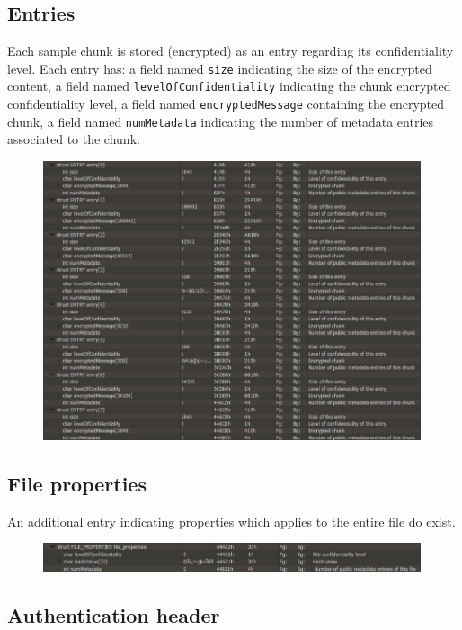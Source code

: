 \subsection{Entries}

Each sample chunk is stored (encrypted) as an entry regarding its
confidentiality level. Each entry has: a field named \texttt{size} indicating
the size of the encrypted content, a field named
\texttt{levelOfConfidentiality} indicating the chunk encrypted confidentiality
level, a field named \texttt{encryptedMessage} containing the encrypted chunk,
a field named \texttt{numMetadata} indicating the number of metadata entries
associated to the chunk.
\begin{figure}[h]
  \centering
  \includegraphics[width=0.99\textwidth]{./figures/UMSEEntries}
\end{figure}

\subsection{File properties}
An additional entry indicating properties which applies to the entire file do
exist.
\begin{figure}[h]
  \centering
  \includegraphics[width=0.99\textwidth]{./figures/UMSEFP}
\end{figure}

\subsection{Authentication header}

